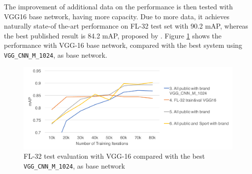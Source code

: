 The improvement of additional data on the performance is then tested with VGG16 base network, having more capacity. Due to more data, it achieves naturally state-of the-art performance on FL-32 test set with 90.2 mAP, whereas the best published result is 84.2 mAP, proposed by \cite{Bao:2016:RCL:3007669.3007728}. Figure \ref{f:vgg16fltest} shows the performance with VGG-16 base network, compared with the best system using \texttt{VGG\_CNN\_M\_1024}, as base network.

\begin{figure}
  \centering
  \includegraphics[width=150mm]{images/mt/vgg16fltest.pdf}
  \caption{FL-32 test evaluation with VGG-16 compared with the best \texttt{VGG\_CNN\_M\_1024}, as base network}
  \label{f:vgg16fltest}
\end{figure}